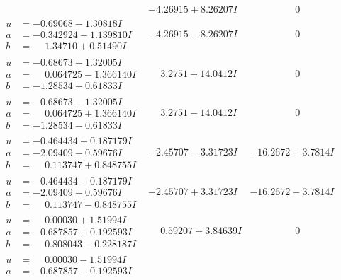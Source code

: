 \documentclass[1p]{elsarticle_modified}
\theoremstyle{definition}
\begin{document}
$$\begin{array}{c|c|c}
 & -4.26915 + 8.26207 I & \phantom{-0.000000 } 0 \\ \hline\begin{aligned}
u &= -0.69068 - 1.30818 I \\
a &= -0.342924 - 1.139810 I \\
b &= \phantom{-}1.34710 + 0.51490 I\end{aligned}
 & -4.26915 - 8.26207 I & \phantom{-0.000000 } 0 \\ \hline\begin{aligned}
u &= -0.68673 + 1.32005 I \\
a &= \phantom{-}0.064725 - 1.366140 I \\
b &= -1.28534 + 0.61833 I\end{aligned}
 & \phantom{-}3.2751 + 14.0412 I & \phantom{-0.000000 } 0 \\ \hline\begin{aligned}
u &= -0.68673 - 1.32005 I \\
a &= \phantom{-}0.064725 + 1.366140 I \\
b &= -1.28534 - 0.61833 I\end{aligned}
 & \phantom{-}3.2751 - 14.0412 I & \phantom{-0.000000 } 0 \\ \hline\begin{aligned}
u &= -0.464434 + 0.187179 I \\
a &= -2.09409 - 0.59676 I \\
b &= \phantom{-}0.113747 + 0.848755 I\end{aligned}
 & -2.45707 - 3.31723 I & -16.2672 + 3.7814 I \\ \hline\begin{aligned}
u &= -0.464434 - 0.187179 I \\
a &= -2.09409 + 0.59676 I \\
b &= \phantom{-}0.113747 - 0.848755 I\end{aligned}
 & -2.45707 + 3.31723 I & -16.2672 - 3.7814 I \\ \hline\begin{aligned}
u &= \phantom{-}0.00030 + 1.51994 I \\
a &= -0.687857 + 0.192593 I \\
b &= \phantom{-}0.808043 - 0.228187 I\end{aligned}
 & \phantom{-}0.59207 + 3.84639 I & \phantom{-0.000000 } 0 \\ \hline\begin{aligned}
u &= \phantom{-}0.00030 - 1.51994 I \\
a &= -0.687857 - 0.192593 I \\

\end{aligned}
\end{array}$$
\end{document}
